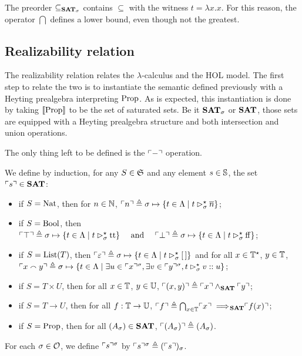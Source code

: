 \documentclass[a4paper,UKenglish,cleveref, autoref, thm-restate]{lipics-v2021}
\begin{document}
\begin{remark}\label{rmk:inclusion}
  The preorder $\subseteq_{{\mathbf{SAT}}_{\sigma}}$ contains $\subseteq$ with the witness $t = \lambda x.x$. For this reason, the operator $\bigcap$ defines a lower bound, even though not the greatest.
\end{remark}


\subsection{Realizability relation}



The realizability relation relates the $\lambda$-calculus and the HOL model. The first step to relate the two is to instantiate the semantic defined previously with a Heyting prealgebra interpreting $\mathrm{Prop}$. As is expected, this instantiation is done by taking $\llbracket \mathrm{Prop} \rrbracket$ to be the set of saturated sets. Be it ${\mathbf{SAT}}_{\sigma}$ or ${\mathbf{SAT}}$, those sets are equipped with a Heyting prealgebra structure and both intersection and union operations.

The only thing left to be defined is the $\ulcorner-\urcorner$ operation.

\begin{definition}
  We define by induction, for any $S \in \mathfrak S$ and any element $s \in \mathbb S$, the set $\ulcorner s\urcorner \in {\mathbf{SAT}}$:
  \begin{itemize}
  \item if $S = \mathrm{Nat}$, then for $n \in \mathbb N$,
    $\ulcorner n\urcorner \triangleq \sigma \mapsto \{ t \in \Lambda \mid t \rhd^{\star}_{\sigma} \overline n\}$;
  \item if $S = \mathrm{Bool}$, then
    $\ulcorner\top\urcorner \triangleq \sigma \mapsto \{ t \in \Lambda \mid t \rhd^{\star}_{\sigma} \mathrm{tt}\}\quad\text{ and }\quad\ulcorner\bot\urcorner \triangleq \sigma\mapsto \{ t \in \Lambda \mid t \rhd^{\star}_{\sigma} \mathrm{ff}\}$;
  \item if $S = \mathrm{List}(T)$, then
    $\ulcorner\varepsilon\urcorner \triangleq \sigma \mapsto\{ t \in \Lambda \mid t \rhd^{\star}_{\sigma} [\,] \}$
    and for all $x \in \mathbb T^\star$, $y \in \mathbb T$,
    \mbox{$\ulcorner x \smallfrown y\urcorner \triangleq \sigma\mapsto \{ t \in \Lambda \mid \exists u \in \ulcorner x\urcorner^{\sigma}, \exists v \in \ulcorner y\urcorner^{\sigma}, t \rhd^{\star}_{\sigma} v :: u\}$};
  \item if $S = T \times U$, then for all $x \in \mathbb T$, $y \in \mathbb U$,
    $\ulcorner(x,y)\urcorner \triangleq \ulcorner x\urcorner \land_{{\mathbf{SAT}}} \ulcorner y\urcorner$;
    
  \item if $S = T \to U$, then for all $f : \mathbb T \to \mathbb U$,
    $\ulcorner f\urcorner \triangleq \bigcap_{x \in \mathbb T} \ulcorner x\urcorner \implies\!\!\!_{{\mathbf{SAT}}} \ulcorner f(x)\urcorner$;
    
  \item if $S = \mathrm{Prop}$, then for all $(A_\sigma) \in {\mathbf{SAT}}$,
    $\ulcorner(A_\sigma)\urcorner \triangleq (A_\sigma)$.
  \end{itemize}
  For each $\sigma\in\mathcal O$, we define $\ulcorner s\urcorner^{\sigma}$ by $\ulcorner s\urcorner^{\sigma} \triangleq (\ulcorner s\urcorner)_\sigma$.
\end{definition}
\end{document}
